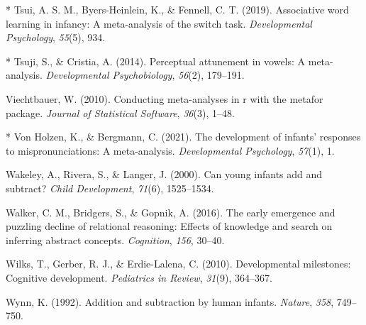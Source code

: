 \documentclass[10pt, letterpaper]{article}
\newenvironment{CSLReferences}%
  {}%
  {\par}
\begin{document}
\begin{CSLReferences}
\leavevmode{}%
* Tsui, A. S. M., Byers-Heinlein, K., \& Fennell, C. T. (2019).
Associative word learning in infancy: A meta-analysis of the switch
task. \emph{Developmental Psychology}, \emph{55}(5), 934.

\leavevmode{}%
* Tsuji, S., \& Cristia, A. (2014). Perceptual attunement in vowels: A
meta-analysis. \emph{Developmental Psychobiology}, \emph{56}(2),
179--191.

\leavevmode{}%
Viechtbauer, W. (2010). Conducting meta-analyses in r with the metafor
package. \emph{Journal of Statistical Software}, \emph{36}(3), 1--48.

\leavevmode{}%
* Von Holzen, K., \& Bergmann, C. (2021). The development of infants'
responses to mispronunciations: A meta-analysis. \emph{Developmental
Psychology}, \emph{57}(1), 1.

\leavevmode{}%
Wakeley, A., Rivera, S., \& Langer, J. (2000). Can young infants add and
subtract? \emph{Child Development}, \emph{71}(6), 1525--1534.

\leavevmode{}%
Walker, C. M., Bridgers, S., \& Gopnik, A. (2016). The early emergence
and puzzling decline of relational reasoning: Effects of knowledge and
search on inferring abstract concepts. \emph{Cognition}, \emph{156},
30--40.

\leavevmode{}%
Wilks, T., Gerber, R. J., \& Erdie-Lalena, C. (2010). Developmental
milestones: Cognitive development. \emph{Pediatrics in Review},
\emph{31}(9), 364--367.

\leavevmode{}%
Wynn, K. (1992). Addition and subtraction by human infants.
\emph{Nature}, \emph{358}, 749--750.

\end{CSLReferences}


\end{document}
